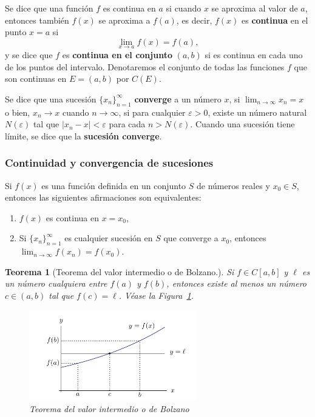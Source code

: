 \documentclass[12pt]{article}
\newtheorem{Teo}{Teorema}
\begin{document}
Se dice que una función $f$ es continua en $a$ si cuando $x$ se aproxima al valor de $a$, entonces también $f(x)$ se aproxima a $f(a)$, es decir, $f(x)$ es \textbf{continua} en el punto $x = a $ si $$\lim_{x \to a} f(x) = f(a),$$
y se dice que $f$ es \textbf{continua en el conjunto} $(a,b)$ si es continua en cada uno de los puntos del intervalo. Denotaremos el conjunto de todas las funciones $f$ que son continuas en $E=(a,b)$ por $C(E)$. \bigskip

Se dice que una sucesión $\{x_n\}_{n=1}^\infty$ \textbf{converge} a un número $x$, si
$\lim_{n \to \infty} x_n = x$ o bien, $x_n \to x$ cuando $n \to \infty$, si para cualquier $\varepsilon > 0$, existe un número natural $N(\varepsilon)$ tal que $|x_n - x| < \varepsilon$ para cada $n > N(\varepsilon)$. Cuando una sucesión tiene límite, se dice que la \textbf{sucesión converge}.

\subsubsection{Continuidad y convergencia de sucesiones}

Si $f(x)$ es una función definida en un conjunto $S$ de números reales y $x_0 \in S$, entonces las siguientes afirmaciones son equivalentes:
\begin{enumerate}
\item $f(x) $ es continua en $x = x_0 $,
\item Si $\{x_n\}_{n=1}^\infty $ es cualquier sucesión en $S $ que converge a $x_0 $, entonces $\lim_{n \to \infty} f(x_n) = f(x_0).$
\end{enumerate}

\begin{Teo}[Teorema del valor intermedio o de Bolzano.]
Si $f \in C[a, b] $ y $\ell $ es un número cualquiera entre $f(a) $ y $f(b) $, entonces existe al menos un número $c \in (a, b) $ tal que $f(c) = \ell $. Véase la Figura~\ref{fig:bolzano}.

\begin{figure}[H]
\centering
\includegraphics[width=0.65\textwidth]{Fig1.png}
\caption{Teorema del valor intermedio o de Bolzano}
\label{fig:bolzano}
\end{figure}
\end{Teo}
\end{document}
